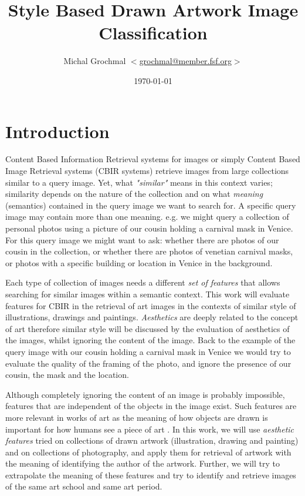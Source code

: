 \documentclass[a4paper]{article}
\title{Style Based Drawn Artwork Image Classification}
\author{Michal Grochmal
  $<$\href{mailto:grochmal@member.fsf.org}{grochmal@member.fsf.org}$>$
}
\date{\today}
\begin{document}
\maketitle

\section{Introduction}

Content Based Information Retrieval systems for images or simply Content Based
Image Retrieval systems (CBIR systems) retrieve images from large collections
similar to a query image.  Yet, what \emph{"similar"} means in this context
varies;  similarity depends on the nature of the collection and on what
\emph{meaning} (semantics) contained in the query image we want to search for.
A specific query image may contain more than one meaning.  e.g. we might query
a collection of personal photos using a picture of our cousin holding a
carnival mask in Venice.  For this query image we might want to ask: whether
there are photos of our cousin in the collection, or whether there are photos
of venetian carnival masks, or photos with a specific building or location in
Venice in the background.

Each type of collection of images needs a different \emph{set of features} that
allows searching for similar images within a semantic context.  This work will
evaluate features for CBIR in the retrieval of art images in the contexts of
similar style of illustrations, drawings and paintings.  \emph{Aesthetics} are
deeply related to the concept of art \cite{rmc12ajs} therefore similar style
will be discussed by the evaluation of aesthetics of the images, whilst
ignoring the content of the image.  Back to the example of the query image with
our cousin holding a carnival mask in Venice we would try to evaluate the
quality of the framing of the photo, and ignore the presence of our cousin, the
mask and the location.

Although completely ignoring the content of an image is probably impossible,
features that are independent of the objects in the image exist.  Such features
are more relevant in works of art \cite{zirnhelt07art} as the meaning of how
objects are drawn is important for how humans see a piece of art
\cite{mach10clas}.  In this work, we will use \emph{aesthetic features} tried
on collections of drawn artwork (illustration, drawing and painting) and on
collections of photography, and apply them for retrieval of artwork with the
meaning of identifying the author of the artwork.  Further, we will try to
extrapolate the meaning of these features and try to identify and retrieve
images of the same art school and same art period.
\end{document}
